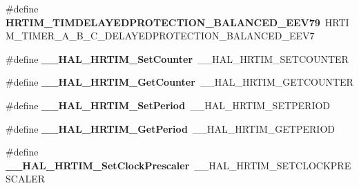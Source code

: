 \begin{DoxyCompactItemize}
\mbox{\label{group___h_a_l___h_r_t_i_m___aliased___macros_gad90cefe9f64cf5f3efe38213706b4f94}} 
\#define {\bfseries H\+R\+T\+I\+M\+\_\+\+T\+I\+M\+D\+E\+L\+A\+Y\+E\+D\+P\+R\+O\+T\+E\+C\+T\+I\+O\+N\+\_\+\+B\+A\+L\+A\+N\+C\+E\+D\+\_\+\+E\+E\+V79}~H\+R\+T\+I\+M\+\_\+\+T\+I\+M\+E\+R\+\_\+\+A\+\_\+\+B\+\_\+\+C\+\_\+\+D\+E\+L\+A\+Y\+E\+D\+P\+R\+O\+T\+E\+C\+T\+I\+O\+N\+\_\+\+B\+A\+L\+A\+N\+C\+E\+D\+\_\+\+E\+E\+V7
\item 
\mbox{\label{group___h_a_l___h_r_t_i_m___aliased___macros_gaa11c36c62453d27a8dd6db62917fb463}} 
\#define {\bfseries \+\_\+\+\_\+\+H\+A\+L\+\_\+\+H\+R\+T\+I\+M\+\_\+\+Set\+Counter}~\+\_\+\+\_\+\+H\+A\+L\+\_\+\+H\+R\+T\+I\+M\+\_\+\+S\+E\+T\+C\+O\+U\+N\+T\+ER
\item 
\mbox{\label{group___h_a_l___h_r_t_i_m___aliased___macros_ga884c22338dec011ab9e4055589c6cd01}} 
\#define {\bfseries \+\_\+\+\_\+\+H\+A\+L\+\_\+\+H\+R\+T\+I\+M\+\_\+\+Get\+Counter}~\+\_\+\+\_\+\+H\+A\+L\+\_\+\+H\+R\+T\+I\+M\+\_\+\+G\+E\+T\+C\+O\+U\+N\+T\+ER
\item 
\mbox{\label{group___h_a_l___h_r_t_i_m___aliased___macros_ga3e6ec773e1fd492d3cc4e9ff84054675}} 
\#define {\bfseries \+\_\+\+\_\+\+H\+A\+L\+\_\+\+H\+R\+T\+I\+M\+\_\+\+Set\+Period}~\+\_\+\+\_\+\+H\+A\+L\+\_\+\+H\+R\+T\+I\+M\+\_\+\+S\+E\+T\+P\+E\+R\+I\+OD
\item 
\mbox{\label{group___h_a_l___h_r_t_i_m___aliased___macros_ga6ca57b361c0d23cb29ed29beddb189a4}} 
\#define {\bfseries \+\_\+\+\_\+\+H\+A\+L\+\_\+\+H\+R\+T\+I\+M\+\_\+\+Get\+Period}~\+\_\+\+\_\+\+H\+A\+L\+\_\+\+H\+R\+T\+I\+M\+\_\+\+G\+E\+T\+P\+E\+R\+I\+OD
\item 
\mbox{\label{group___h_a_l___h_r_t_i_m___aliased___macros_gab5a9ad347b90b2128c7d4fe100758b7d}} 
\#define {\bfseries \+\_\+\+\_\+\+H\+A\+L\+\_\+\+H\+R\+T\+I\+M\+\_\+\+Set\+Clock\+Prescaler}~\+\_\+\+\_\+\+H\+A\+L\+\_\+\+H\+R\+T\+I\+M\+\_\+\+S\+E\+T\+C\+L\+O\+C\+K\+P\+R\+E\+S\+C\+A\+L\+ER
\item 
\mbox{\label{group___h_a_l___h_r_t_i_m___aliased___macros_ga2647242e720056855c36153ef4c19d86}} 

\end{DoxyCompactItemize}
